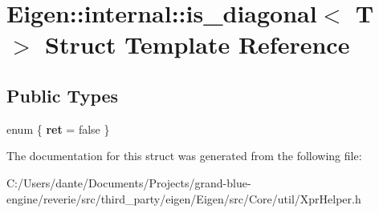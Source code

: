 \hypertarget{struct_eigen_1_1internal_1_1is__diagonal}{}\section{Eigen\+::internal\+::is\+\_\+diagonal$<$ T $>$ Struct Template Reference}
\label{struct_eigen_1_1internal_1_1is__diagonal}
\subsection*{Public Types}
\begin{DoxyCompactItemize}
\item 
\mbox{\label{struct_eigen_1_1internal_1_1is__diagonal_a24aa4d139086fa213102fa6dede05664}} 
enum \{ {\bfseries ret} = false
 \}
\end{DoxyCompactItemize}


The documentation for this struct was generated from the following file\+:\begin{DoxyCompactItemize}
\item 
C\+:/\+Users/dante/\+Documents/\+Projects/grand-\/blue-\/engine/reverie/src/third\+\_\+party/eigen/\+Eigen/src/\+Core/util/Xpr\+Helper.\+h\end{DoxyCompactItemize}
